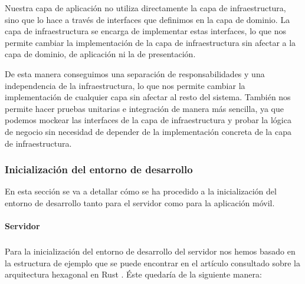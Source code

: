 Nuestra capa de aplicación no utiliza directamente la capa de infraestructura, sino que lo hace a través de interfaces que definimos en la capa de dominio. La capa de infraestructura se encarga de implementar estas interfaces, lo que nos permite cambiar la implementación de la capa de infraestructura sin afectar a la capa de dominio, de aplicación ni la de presentación.

De esta manera conseguimos una separación de responsabilidades y una independencia de la infraestructura, lo que nos permite cambiar la implementación de cualquier capa sin afectar al resto del sistema.
También nos permite hacer pruebas unitarias e integración de manera más sencilla, ya que podemos \gls{mockear} las interfaces de la capa de infraestructura y probar la lógica de negocio sin necesidad de depender de la implementación concreta de la capa de infraestructura.

\subsubsection{Inicialización del entorno de desarrollo}
En esta sección se va a detallar cómo se ha procedido a la inicialización del entorno de desarrollo tanto para el servidor como para la aplicación móvil.
\paragraph{Servidor}
\subparagraph{}
Para la inicialización del entorno de desarrollo del servidor nos hemos basado en la estructura de ejemplo que se puede encontrar en el artículo consultado sobre la arquitectura hexagonal en Rust \parencite{rust-hexagonal-architecture}. Éste quedaría de la siguiente manera:

